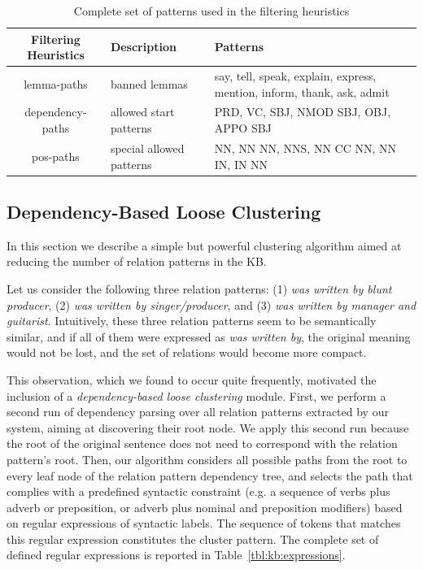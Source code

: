 \begin{table}[]
\scriptsize
\centering
    \begin{tabular}{ c l p{5cm} }
    \hline
    Filtering Heuristics & Description & Patterns \\
    \hline
    lemma-paths & banned lemmas & say, tell, speak, explain, express, mention, inform, thank, ask, admit\\
    \hline
    dependency-paths & allowed start patterns & PRD, VC, SBJ, NMOD SBJ, OBJ, APPO SBJ \\
    \hline
    pos-paths & special allowed patterns & NN, NN NN, NNS, NN CC NN, NN IN, IN NN \\
    \hline
    \end{tabular}
    \caption{Complete set of patterns used in the filtering heuristics}
    \label{tbl:kb:rules}
\end{table}

\subsection{Dependency-Based Loose Clustering}
\label{sec:kb:method:clustering}

In this section we describe a simple but powerful clustering algorithm aimed at reducing the number of relation patterns in the KB. %

Let us consider the following three relation patterns: (1) \textit{was written by blunt producer}, (2) \textit{was written by singer/producer}, and (3) \textit{was written by manager and guitarist}. Intuitively, these three relation patterns seem to be semantically similar, and if all of them were expressed as \textit{was written by}, the original meaning would not be lost, and the set of relations would become more compact.

This observation, which we found to occur quite frequently, motivated the inclusion of a \textit{dependency-based loose clustering} module. First, we perform a second run of dependency parsing over all relation patterns extracted by our system, aiming at discovering their root node. We apply this second run because the root of the original sentence does not need to correspond with the relation pattern's root. Then, our algorithm considers all possible paths from the root to every leaf node of the relation pattern dependency tree, and selects the path that complies with a predefined syntactic constraint (e.g. a sequence of verbs plus adverb or preposition, or adverb plus nominal and preposition modifiers) based on regular expressions of syntactic labels. The sequence of tokens that matches this regular expression constitutes the cluster pattern. The complete set of defined regular expressions is reported in Table~\ref{tbl:kb:expressions}. %

